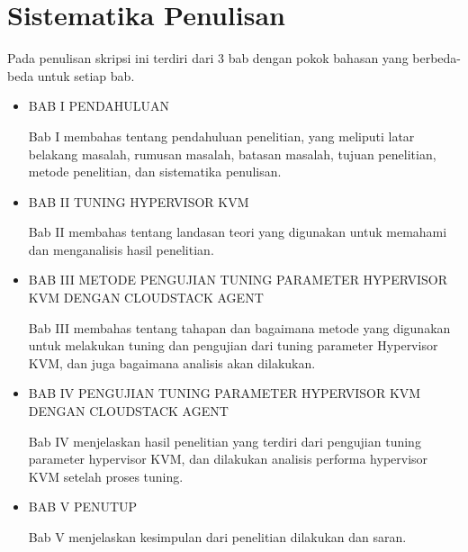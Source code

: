 \section{Sistematika Penulisan}
Pada penulisan skripsi ini terdiri dari 3 bab dengan pokok bahasan yang berbeda-beda untuk setiap bab.
\begin{itemize}
    \item BAB I PENDAHULUAN

    Bab I membahas tentang pendahuluan penelitian, yang meliputi latar belakang masalah, rumusan masalah, batasan masalah, tujuan penelitian, metode penelitian, dan sistematika penulisan.
    
    \item BAB II TUNING HYPERVISOR KVM

    Bab II membahas tentang landasan teori yang digunakan untuk memahami dan menganalisis hasil penelitian.
    
    \item BAB III METODE PENGUJIAN TUNING PARAMETER HYPERVISOR KVM DENGAN CLOUDSTACK AGENT
    
    Bab III membahas tentang tahapan dan bagaimana metode yang digunakan untuk melakukan tuning dan pengujian dari tuning parameter Hypervisor KVM, dan juga bagaimana analisis akan dilakukan.

    \item BAB IV PENGUJIAN TUNING PARAMETER HYPERVISOR KVM DENGAN CLOUDSTACK AGENT
    
    Bab IV menjelaskan hasil penelitian yang terdiri dari pengujian tuning parameter hypervisor KVM, dan dilakukan analisis performa hypervisor KVM setelah proses tuning.

    \item BAB V PENUTUP
    
    Bab V menjelaskan kesimpulan dari penelitian dilakukan dan saran.
\end{itemize}